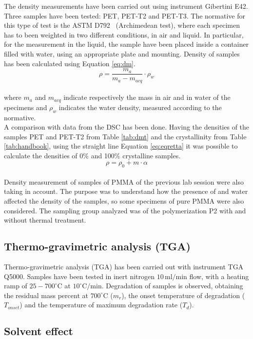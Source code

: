 \documentclass[a4paper, 11pt]{article}
\begin{document}
The density measurements have been carried out using instrument Gibertini E42. Three samples have been tested: PET, PET-T2 and PET-T3. The normative for this type of test is the ASTM D792~\cite{densità} (Archimedean test), where each specimen has to been weighted in two different conditions, in air and liquid. In particular, for the measurement in the liquid, the sample have been placed inside a container filled with water, using an appropriate plate and mounting. Density of samples has been calculated using Equation \ref{eq:dm}.
\begin{equation}
\rho=\frac{m_{a}}{m_{a}-m_{acq}}\cdot\rho_{w}
\label{eq:dm}
\end{equation}\\
where $m_{a}$ and $m_{acq}$ indicate respectively the mass in air and in water of the specimens and $\rho_{w}$ indicates the water density, measured according to the normative.\\
A comparison with data from the DSC has been done. Having the densities of the samples PET and PET-T2 from Table \ref{tab:dmt} and the crystallinity from Table \ref{tab:handbook}, using the straight line Equation \ref{eq:eqretta} it was possible to calculate the densities of 0\% and 100\% crystalline samples.
\begin{equation}
\rho=\rho_{0}+m\cdot\alpha
\label{eq:eqretta}
\end{equation}\\
Density measurement of samples of PMMA of the previous lab session were also taking in account. The purpose was to understand how the presence of  and water affected the density of the samples, so some specimens of pure PMMA were also considered. The sampling group analyzed was of the polymerization P2 with and without thermal treatment.

\subsection{Thermo-gravimetric analysis (TGA)}

Thermo-gravimetric analysis (TGA) has been carried out with instrument TGA Q5000. Samples have been tested in inert nitrogen $10\,\text{ml/min}$ flow, with a heating ramp of $25-700^\circ$C at $10^\circ\text{C/min}$. Degradation of samples is observed, obtaining the residual mass percent at $700^\circ$C ($m_r$), the onset temperature of degradation ($T_{onset}$) and the temperature of maximum degradation rate ($T_d$). 

\subsection{Solvent effect}
\end{document}
